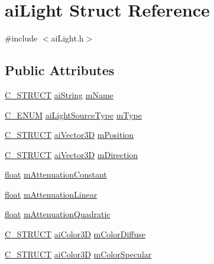 \hypertarget{structai_light}{\section{ai\-Light Struct Reference}
\label{structai_light}
}


{\ttfamily \#include $<$ai\-Light.\-h$>$}

\subsection*{Public Attributes}
\begin{DoxyCompactItemize}
\item 
\hyperlink{ai_defines_8h_ab51df4230ceb602bbc1bc109c432a6a0}{C\-\_\-\-S\-T\-R\-U\-C\-T} \hyperlink{structai_string}{ai\-String} \hyperlink{structai_light_a92806413f16230728b04e5f379fd00c0}{m\-Name}
\item 
\hyperlink{ai_defines_8h_aa8c1788fd9d096036c9e3b6cfe4b1301}{C\-\_\-\-E\-N\-U\-M} \hyperlink{ai_light_8h_a7a75cb224d903e71e8daede432449766}{ai\-Light\-Source\-Type} \hyperlink{structai_light_a4cba1741875dd92724ff55be91c60c2b}{m\-Type}
\item 
\hyperlink{ai_defines_8h_ab51df4230ceb602bbc1bc109c432a6a0}{C\-\_\-\-S\-T\-R\-U\-C\-T} \hyperlink{structai_vector3_d}{ai\-Vector3\-D} \hyperlink{structai_light_a5daf9c9ad2613603b847a527123611f0}{m\-Position}
\item 
\hyperlink{ai_defines_8h_ab51df4230ceb602bbc1bc109c432a6a0}{C\-\_\-\-S\-T\-R\-U\-C\-T} \hyperlink{structai_vector3_d}{ai\-Vector3\-D} \hyperlink{structai_light_af3776d5e4e6065cb6dd7e10dc656dada}{m\-Direction}
\item 
\hyperlink{fmod_8h_aeb841aa4b4b5f444b5d739d865b420af}{float} \hyperlink{structai_light_ae8804b3c309527ca0f85d676bab55710}{m\-Attenuation\-Constant}
\item 
\hyperlink{fmod_8h_aeb841aa4b4b5f444b5d739d865b420af}{float} \hyperlink{structai_light_aefda311eaa785ea345782dfa95be817c}{m\-Attenuation\-Linear}
\item 
\hyperlink{fmod_8h_aeb841aa4b4b5f444b5d739d865b420af}{float} \hyperlink{structai_light_ab4fb07bfa40a807661b1ed1791838a6d}{m\-Attenuation\-Quadratic}
\item 
\hyperlink{ai_defines_8h_ab51df4230ceb602bbc1bc109c432a6a0}{C\-\_\-\-S\-T\-R\-U\-C\-T} \hyperlink{structai_color3_d}{ai\-Color3\-D} \hyperlink{structai_light_a22e7feebbfaf53adf73bd9f581636efd}{m\-Color\-Diffuse}
\item 
\hyperlink{ai_defines_8h_ab51df4230ceb602bbc1bc109c432a6a0}{C\-\_\-\-S\-T\-R\-U\-C\-T} \hyperlink{structai_color3_d}{ai\-Color3\-D} \hyperlink{structai_light_aa79ae6ad6a10f0cb9c740e23b6bb01bf}{m\-Color\-Specular}

\end{DoxyCompactItemize}
